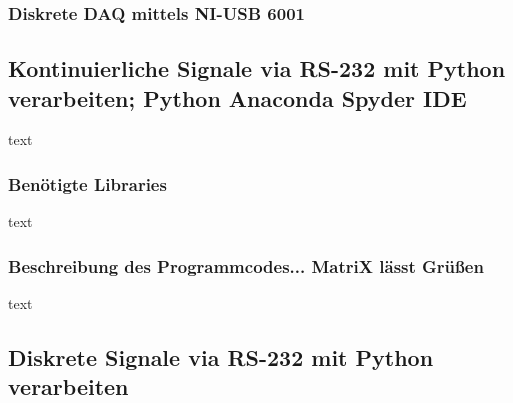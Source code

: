 \subsubsection{Diskrete DAQ mittels NI-USB 6001}

\subsection{Kontinuierliche Signale via RS-232 mit Python verarbeiten; Python Anaconda Spyder IDE}
text


\subsubsection{Benötigte Libraries}
text

\subsubsection{Beschreibung des Programmcodes... MatriX lässt Grüßen}
text

\subsection{Diskrete Signale via RS-232 mit Python verarbeiten}

